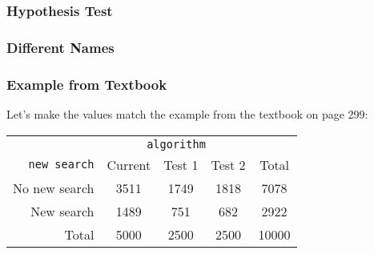\documentclass[handout]{beamer}
\newcommand{\blue}[1]{\textcolor{blue2}{#1}}
\begin{document}
\begin{frame}
\frametitle{Hypothesis Test}

%
%

\end{frame}


\begin{frame}
\frametitle{Different Names}

%
%

\end{frame}


\begin{frame}
\frametitle{Example from Textbook}

Let's make the values match the example from the textbook on page 299:
\begin{center}
  \begin{tabular}{r|ccc|c}
& \multicolumn{3}{c|}{{\tt algorithm}} & \\
       {\tt new search} & Current & Test 1 & Test 2 & Total \\ 
\hline
    No new search & 3511 & 1749 & 1818 & 7078 \\ 
    New search & 1489 & 751 & 682 & 2922 \\ 
\hline
    Total & 5000 & 2500 & 2500 & 10000 \\ 
  \end{tabular}
\end{center}


\end{frame}
\end{document}
